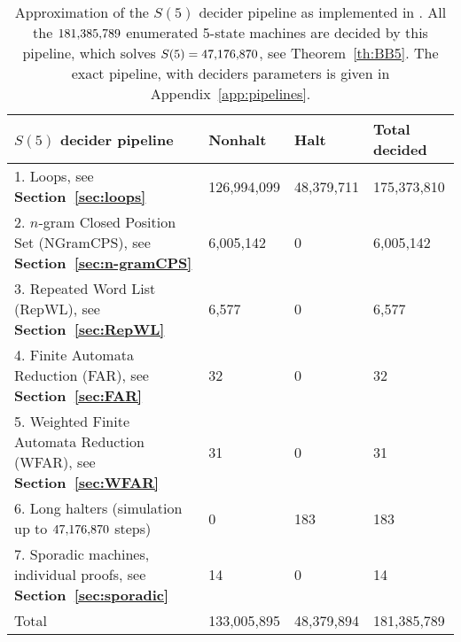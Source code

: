 \begin{table}[h!]
    \centering
    \begin{tabular}{|l|lll|}
        \hline
        $S(5)$ decider pipeline                                                              & Nonhalt                         & Halt                           & Total decided \\
        \hline
        1. Loops, see \textbf{Section~\ref{sec:loops}}                                       & 126,994,099                     & 48,379,711                     & 175,373,810   \\
        2. $n$-gram Closed Position Set (NGramCPS), see \textbf{Section~\ref{sec:n-gramCPS}} & 6,005,142                       & 0                              & 6,005,142     \\
        3. Repeated Word List (RepWL), see \textbf{Section~\ref{sec:RepWL}}                  & 6,577                           & 0                              & 6,577         \\
        4. Finite Automata Reduction (FAR), see \textbf{Section~\ref{sec:FAR}}               & 32                              & 0                              & 32            \\
        5. Weighted Finite Automata Reduction (WFAR), see \textbf{Section~\ref{sec:WFAR}}    & 31                              & 0                              & 31            \\
        6. Long halters (simulation up to $47{,}176{,}870$ steps)                               & 0                               & 183                            & 183           \\
        7. Sporadic machines, individual proofs, see \textbf{Section~\ref{sec:sporadic}}     & 14                              & 0                              & 14            \\ \hline
        Total                                                                                & \multicolumn{1}{r}{133,005,895} & \multicolumn{1}{r}{48,379,894} & 181,385,789   \\ \hline
    \end{tabular}
    \caption{Approximation of the $S(5)$ decider pipeline as implemented in \CoqBB. All the $181{,}385{,}789$ enumerated 5-state machines are decided by this pipeline, which solves $S(5) = 47{,}176{,}870$, see Theorem~\ref{th:BB5}. The exact pipeline, with deciders parameters is given in Appendix~\ref{app:pipelines}. }\label{tab:pipelineBB5}
\end{table}

